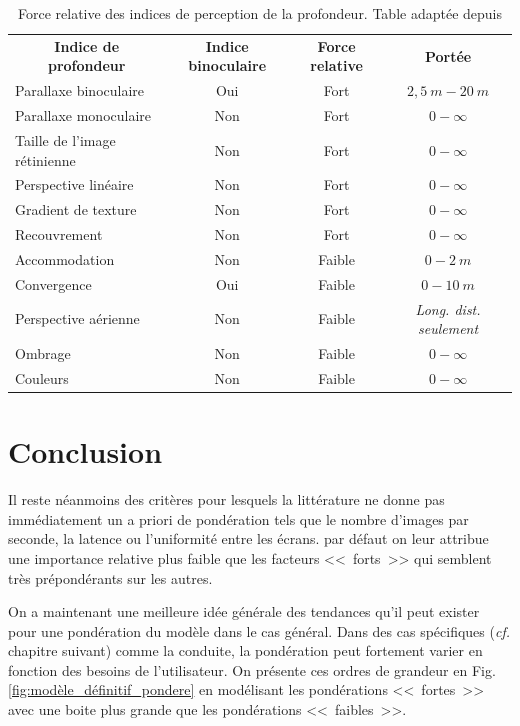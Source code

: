 \begin{table}[h]	
	\centering
	\caption{Force relative des indices de perception de la profondeur. Table adaptée depuis \citep{mehrabi_making_2013}}
	\label{tab:ponderation_depth_cues}
	\small
	\begin{tabular}{lccc}
		\multicolumn{1}{c}{\bfseries Indice de profondeur} & \multicolumn{1}{c}{\bfseries Indice binoculaire} & \multicolumn{1}{c}{\bfseries Force relative} & \multicolumn{1}{c}{\bfseries Portée}\\		
		Parallaxe binoculaire & Oui & Fort & $2,5~m - 20~m$\\
		Parallaxe monoculaire & Non & Fort & $0 - \infty$\\
		Taille de l'image rétinienne & Non & Fort & $0 - \infty$\\
		Perspective linéaire & Non & Fort & $0 - \infty$\\
		Gradient de texture & Non & Fort & $0 - \infty$\\
		Recouvrement & Non & Fort & $0 - \infty$\\
		Accommodation & Non & Faible & $0 - 2~m$\\
		Convergence & Oui & Faible & $0 - 10~m$\\
		Perspective aérienne & Non & Faible & \textit{Long. dist. seulement}\\
		Ombrage & Non & Faible & $0 - \infty$\\
		Couleurs & Non & Faible & $0 - \infty$\\
	\end{tabular}
\end{table}

\section{Conclusion}
\par Il reste néanmoins des critères pour lesquels la littérature ne donne pas immédiatement un a priori de pondération tels que le nombre d'images par seconde, la latence ou l'uniformité entre les écrans. par défaut on leur attribue une importance relative plus faible que les facteurs <<~forts~>> qui semblent très prépondérants sur les autres.

\par On a maintenant une meilleure idée générale des tendances qu'il peut exister pour une pondération du modèle dans le cas général. Dans des cas spécifiques (\textit{cf.} chapitre suivant) comme la conduite, la pondération peut fortement varier en fonction des besoins de l'utilisateur. On présente ces ordres de grandeur en Fig. \ref{fig:modèle_définitif_pondere} en modélisant les pondérations <<~fortes~>> avec une boite plus grande que les pondérations <<~faibles~>>.

